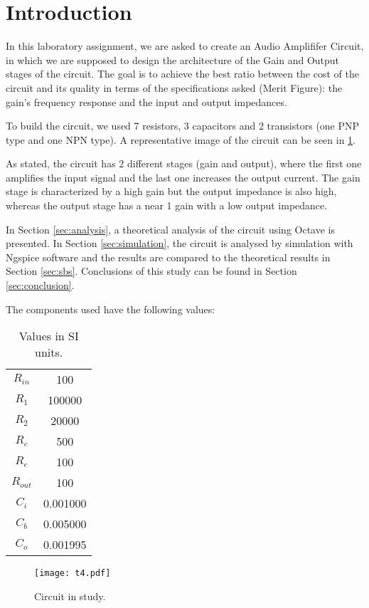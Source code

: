 \section{Introduction}
\label{sec:introduction}

In this laboratory assignment, we are asked to create an Audio Amplififer Circuit, in which we are supposed to design the architecture of the Gain and Output stages of the circuit. The goal is to achieve the best ratio between the cost of the circuit and its quality in terms of the specifications asked (Merit Figure): the gain's frequency response and the input and output impedances. \par
To build the circuit, we used 7 resistors, 3 capacitors and 2 transistors (one PNP type and one NPN type). A representative image of the circuit can be seen in \ref{fig:t4}. \par
As stated, the circuit has 2 different stages (gain and output), where the first one amplifies the input signal and the last one increases the output current. The gain stage is characterized by a high gain but the output impedance is also high, whereas the output stage has a near 1 gain with a low output impedance.


In Section \ref{sec:analysis}, a theoretical analysis of the circuit using Octave is
presented. In Section \ref{sec:simulation}, the circuit is analysed by
simulation with Ngspice software and the results are compared to the theoretical results in Section \ref{sec:sbs}. Conclusions of this study can be found in
Section \ref{sec:conclusion}.

The components used have the following values:
\begin{table}[h]
\centering
\begin{small}
\caption{Values in SI units.}
\begin{tabular}{|c|c|}
\hline
$R_{in}$ & 100 \\
$R_1$ & 100000 \\
$R_2$ & 20000 \\
$R_c$ & 500 \\
$R_e$ & 100 \\
$R_{out}$ & 100 \\
$C_i$ & 0.001000 \\
$C_b$ & 0.005000 \\
$C_o$ & 0.001995 \\
\hline
\end{tabular}
\end{small}
\end{table}

\begin{figure}[htp] \centering
\texttt{[image: t4.pdf]}
\caption{Circuit in study.}
\label{fig:t4}
\end{figure}
\FloatBarrier

